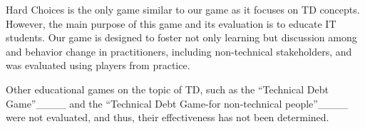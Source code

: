         Hard Choices is the only game similar to our game as it focuses on TD concepts. 
        However, the main purpose of this game and its evaluation is to educate IT students.
        Our game is designed to foster not only learning but discussion among and behavior change in practitioners, including non-technical stakeholders, and was evaluated using players from practice. 

        Other educational games on the topic of TD, such as the ``Technical Debt Game''____ and the ``Technical Debt Game-for non-technical people''____ were not evaluated, and thus, their effectiveness has not been determined. 
